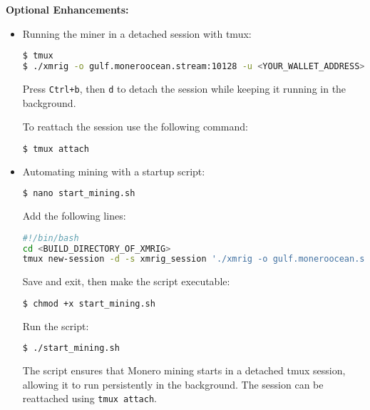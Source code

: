 \vspace{0.5cm}

\noindent \textbf{Optional Enhancements:}
\begin{itemize}
\item Running the miner in a detached session with tmux:
\begin{lstlisting}[language=bash, breaklines=true, breakatwhitespace=true, columns=fullflexible]
$ tmux
$ ./xmrig -o gulf.moneroocean.stream:10128 -u <YOUR_WALLET_ADDRESS> -p <WORKER_NAME>
\end{lstlisting}
Press \texttt{Ctrl+b}, then \texttt{d} to detach the session while keeping it running in the background.

To reattach the session use the following command:
\begin{lstlisting}[language=bash, breaklines=true, breakatwhitespace=true, columns=fullflexible]
$ tmux attach
\end{lstlisting}
        
\item Automating mining with a startup script:
\begin{lstlisting}[language=bash, breaklines=true, breakatwhitespace=true, columns=fullflexible]
$ nano start_mining.sh
\end{lstlisting}
Add the following lines:
\begin{lstlisting}[language=bash, breaklines=true, breakatwhitespace=true, columns=fullflexible]
#!/bin/bash
cd <BUILD_DIRECTORY_OF_XMRIG>
tmux new-session -d -s xmrig_session './xmrig -o gulf.moneroocean.stream:10128 -u <YOUR_WALLET_ADDRESS> -p <WORKER_NAME>'
\end{lstlisting}
Save and exit, then make the script executable:
\begin{lstlisting}[language=bash, breaklines=true, breakatwhitespace=true, columns=fullflexible]
$ chmod +x start_mining.sh
\end{lstlisting}
Run the script:
\begin{lstlisting}[language=bash, breaklines=true, breakatwhitespace=true, columns=fullflexible]
$ ./start_mining.sh
\end{lstlisting}
The script ensures that Monero mining starts in a detached tmux session, allowing it to run persistently in the background. The session can be reattached using \texttt{tmux attach}.
\end{itemize}

